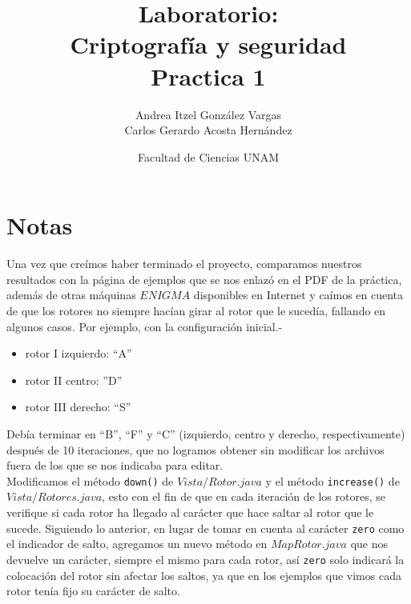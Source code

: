 \documentclass[12pt]{article}
\title{Laboratorio: \\Criptografía y seguridad \\ Practica 1}
\author{Andrea Itzel González Vargas \\ Carlos Gerardo Acosta Hernández}
\date{Facultad de Ciencias UNAM}
\begin{document}
\maketitle
\section{Notas}

Una vez que creímos haber terminado el proyecto, comparamos nuestros resultados con la página de ejemplos que se nos enlazó en el PDF de la práctica, además de otras máquinas $ENIGMA$ disponibles en Internet y caímos en cuenta de que los rotores no siempre hacían girar al rotor que le sucedía, fallando en algunos casos. Por ejemplo, con la configuración inicial.-
\begin{itemize}
\item rotor I izquierdo: ``A''
\item rotor II centro: ''D''
\item rotor III derecho: ``S''
\end{itemize}
Debía terminar en ``B'', ``F'' y ``C'' (izquierdo, centro y derecho, respectivamente) después de 10 iteraciones, que no logramos obtener sin modificar los archivos fuera de los que se nos indicaba para editar. \\ 

Modificamos el método \texttt{down()} de $Vista/Rotor.java$ y el método \texttt{increase()} de $Vista/Rotores.java$, esto con el fin de que en cada iteración de los rotores, se verifique si cada rotor ha llegado al carácter que hace saltar al rotor que le sucede. Siguiendo lo anterior, en lugar de tomar en cuenta al carácter \texttt{zero} como el indicador de salto, agregamos un nuevo método en $MapRotor.java$ que nos devuelve un carácter, siempre el mismo para cada rotor, así \texttt{zero} solo indicará la colocación del rotor sin afectar los saltos, ya que en los ejemplos que vimos cada rotor tenía fijo su carácter de salto. \\
\end{document}
